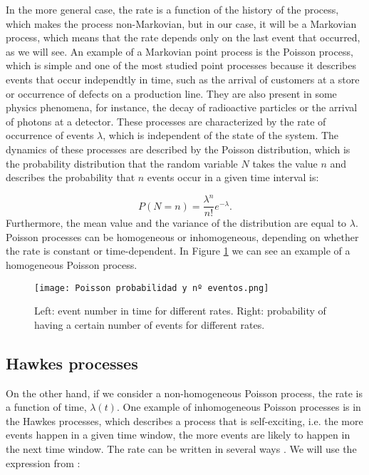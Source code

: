 In the more general case, the rate is a function of the history of the process, which makes the process non-Markovian, but in our case, it will be a Markovian process, which means that the rate 
depends only on the last event that occurred, as we will see. An example of a Markovian point process is the Poisson process, which is simple and one of the most studied point processes because 
it describes events that occur independtly in time, such as the arrival of customers at a store or occurrence of defects on a production line. They are also present in some physics phenomena,
for instance, the decay of radioactive particles or the arrival of photons at a detector. These processes are characterized by the rate of occurrence of events $\lambda$, 
which is independent of the state of the system.
The dynamics of these processes are described by the Poisson distribution, which is the probability distribution that the random variable $N$ takes the value $n$ and describes the 
probability that $n$ events occur in a given time interval is:

\begin{equation}
    P(N=n) = \dfrac{\lambda^n}{n!}e^{-\lambda}.
    \label{eq: Probabilidad proceso de Poisson homogéneo}
\end{equation}
Furthermore, the mean value and the variance of the distribution are equal to $\lambda$. Poisson processes can be homogeneous or inhomogeneous, depending on whether the rate is constant
or time-dependent. In Figure \ref{f:poisson} we can see an example of a homogeneous Poisson process.

\begin{figure}[H]
    \centering
    \texttt{[image: Poisson probabilidad y nº eventos.png]}
    \caption{Left: event number in time for different rates. Right: probability of having a certain number of events for different rates.}
    \label{f:poisson}
\end{figure}

\subsection{Hawkes processes} \label{subsec:Hawkes_processes}

On the other hand, if we consider a non-homogeneous Poisson process, the rate is a function of time, $\lambda(t)$. One example of inhomogeneous Poisson processes is in the Hawkes processes, which 
describes a process that is self-exciting, i.e. the more events happen in a given time window, the more events are likely to happen in the next time window.
The rate can be written in several ways \cite{notarmuzi2021percolation,kanazawa2021ubiquitous,dassios2013exact,laub2021elements}. We will use the expression from \cite{notarmuzi2021percolation}:

